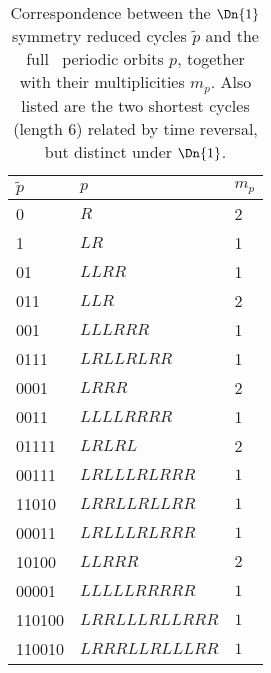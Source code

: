 \begin{table}
\caption[]{\small Correspondence between the $\Dn{1}$ symmetry
reduced cycles $\tilde{p}$ and the full \statesp\
periodic orbits ${p}$, together with their
multiplicities $m_p$. Also listed are the two shortest cycles
(length 6) related by time reversal, but distinct under $\Dn{1}$.
}
{\small
\begin{tabular}{lll}
$\tilde{p}$ & ${p}$  & $m_p$ \\
\hline
 0  & $R$ & 2 \\
 1 & $LR$ & 1 \\ %
 01 & $LLRR$   & 1 \\ %
 011 & $LLR$  & 2 \\
 001 & $LLLRRR$ & 1 \\
 0111 & $LRLLRLRR$  & 1 \\
 0001 & $LRRR$ & 2 \\
 0011 & $LLLLRRRR$ & 1 \\
 01111 & $LRLRL$ & 2 \\
 00111 & $LRLLLRLRRR$  & $1$ \\
 11010 & $LRRLLRLLRR$ & $1$ \\
 00011 & $LRLLLRLRRR$   &    $1$ \\
 10100 & $LLRRR$   &    $2$ \\
 00001 & $LLLLLRRRRR$ & $1$ \\
 110100 & $LRRLLLRLLRRR$ & $1$ \\
 110010 & $LRRRLLRLLLRR$ & $1$ %
\end{tabular}
} %
\label{dscr:t-symm-4}
\end{table}

